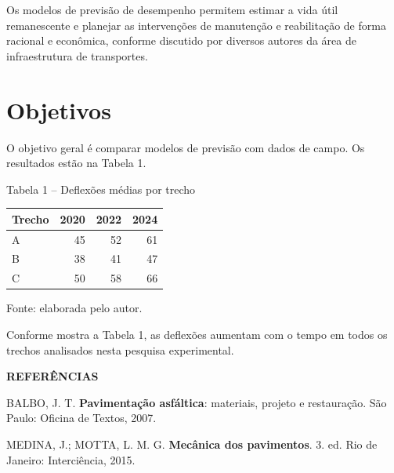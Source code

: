 \documentclass[12pt,a4paper]{report}
\begin{document}
Os modelos de previsão de desempenho permitem estimar a vida útil remanescente e planejar as intervenções de manutenção e reabilitação de forma racional e econômica, conforme discutido por diversos autores da área de infraestrutura de transportes.
\section{Objetivos}
O objetivo geral é comparar modelos de previsão com dados de campo. Os resultados estão na Tabela 1.
\begin{table}[h]\centering\small
Tabela 1 -- Deflexões médias por trecho\par\medskip
\begin{tabular}{lrrr}\toprule Trecho & 2020 & 2022 & 2024\\\midrule A & 45 & 52 & 61\\ B & 38 & 41 & 47\\ C & 50 & 58 & 66\\\bottomrule\end{tabular}

{\footnotesize Fonte: elaborada pelo autor.}
\end{table}

Conforme mostra a Tabela 1, as deflexões aumentam com o tempo em todos os trechos analisados nesta pesquisa experimental.
\clearpage
\begin{center}\textbf{REFERÊNCIAS}\end{center}
\begin{singlespace}\noindent
BALBO, J. T. \textbf{Pavimentação asfáltica}: materiais, projeto e restauração. São Paulo: Oficina de Textos, 2007.\par\vspace{12pt}\noindent
MEDINA, J.; MOTTA, L. M. G. \textbf{Mecânica dos pavimentos}. 3. ed. Rio de Janeiro: Interciência, 2015.\par
\end{singlespace}
\end{document}
